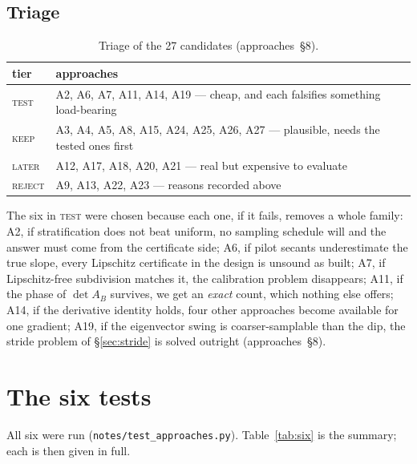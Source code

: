 \documentclass[11pt]{article}
\newcommand{\file}[1]{\texttt{#1}}
\newcommand{\ap}[1]{(approaches~\S#1)}
\begin{document}
\subsection{Triage}

\begin{table}[htbp]
\centering
\caption{Triage of the 27 candidates \ap{8}.}
\begin{tabular}{ll}
\toprule
tier & approaches \\
\midrule
\textsc{test}   & A2, A6, A7, A11, A14, A19 --- cheap, and each falsifies something load-bearing \\
\textsc{keep}   & A3, A4, A5, A8, A15, A24, A25, A26, A27 --- plausible, needs the tested ones first \\
\textsc{later}  & A12, A17, A18, A20, A21 --- real but expensive to evaluate \\
\textsc{reject} & A9, A13, A22, A23 --- reasons recorded above \\
\bottomrule
\end{tabular}
\end{table}

The six in \textsc{test} were chosen because each one, if it fails, removes a whole family: A2, if
stratification does not beat uniform, no sampling schedule will and the answer must come from the
certificate side; A6, if pilot secants underestimate the true slope, every Lipschitz certificate
in the design is unsound as built; A7, if Lipschitz-free subdivision matches it, the calibration
problem disappears; A11, if the phase of $\det A_B$ survives, we get an \emph{exact} count, which
nothing else offers; A14, if the derivative identity holds, four other approaches become available
for one gradient; A19, if the eigenvector swing is coarser-samplable than the dip, the stride
problem of \S\ref{sec:stride} is solved outright \ap{8}.

\section{The six tests}
\label{sec:tests}

All six were run (\file{notes/test\_approaches.py}). Table~\ref{tab:six} is the summary; each is
then given in full.
\end{document}

